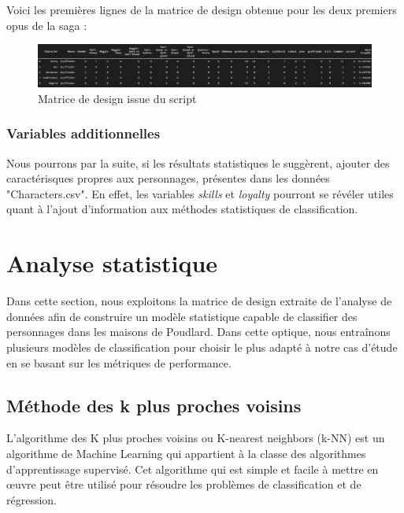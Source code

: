 \documentclass[11pt]{article}
\begin{document}
Voici les premières lignes de la matrice de design obtenue pour les deux premiers opus de la saga :

\begin{figure}[hbt!]
    \centering
    \includegraphics[width= 17 cm]{./figures/script_matrix.png}
    \caption{Matrice de design issue du script}
\end{figure}

\subsubsection{Variables additionnelles}

Nous pourrons par la suite, si les résultats statistiques le suggèrent, ajouter des caractérisques propres aux personnages, présentes dans les données "Characters.csv". En effet, les variables \textit{skills} et \textit{loyalty} pourront se révéler utiles quant à l'ajout d'information aux méthodes statistiques de classification.\par

\section{Analyse statistique}

Dans cette section, nous exploitons la matrice de design extraite de l'analyse de données afin de construire un modèle statistique capable de classifier des personnages dans les maisons de Poudlard. Dans cette optique, nous entraînons plusieurs modèles de classification pour choisir le plus adapté à notre cas d'étude en se basant sur les métriques de performance.\par

\subsection{Méthode des k plus proches voisins}

L’algorithme des K plus proches voisins ou K-nearest neighbors (k-NN) est un algorithme de Machine Learning qui appartient à la classe des algorithmes d’apprentissage supervisé.
Cet algorithme  qui est simple et facile à mettre en œuvre peut être utilisé pour résoudre les problèmes de classification et de régression.{\cite{3}}\par
\end{document}
